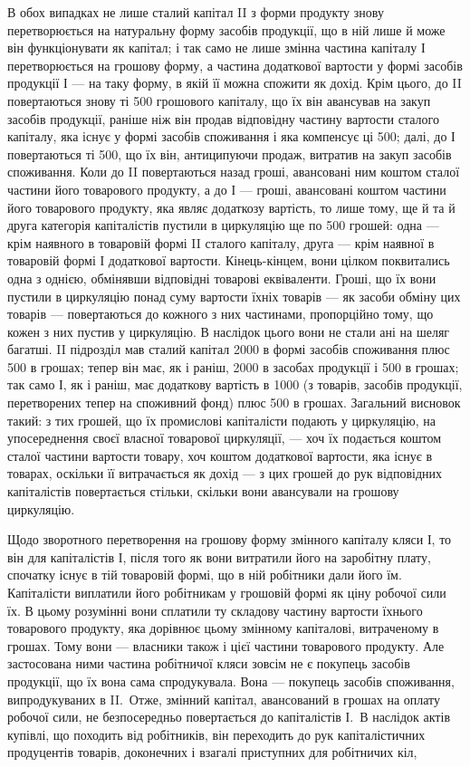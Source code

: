 
В обох випадках не лише сталий капітал II з форми продукту знову
перетворюється на натуральну форму засобів продукції, що в ній лише
й може він функціонувати як капітал; і так само не лише змінна частина
капіталу І перетворюється на грошову форму, а частина додаткової вартости
у формі засобів продукції І — на таку форму, в якій її можна спожити
як дохід. Крім цього, до II повертаються знову ті 500 грошового
капіталу, що їх він авансував на закуп засобів продукції, раніше ніж він
продав відповідну частину вартости сталого капіталу, яка існує у формі
засобів споживання і яка компенсує ці 500; далі, до І повертаються
ті 500, що їх він, антиципуючи продаж, витратив на
закуп засобів споживання. Коли до II повертаються назад гроші, авансовані
ним коштом сталої частини його товарового продукту, а до І — гроші,
авансовані коштом частини його товарового продукту, яка являє додаткозу
вартість, то лише тому, ще й та й друга категорія капіталістів пустили
в циркуляцію ще по 500 грошей: одна — крім наявного
в товаровій формі II сталого капіталу, друга — крім наявної в товаровій
формі І додаткової вартости. Кінець-кінцем, вони цілком поквитались одна
з однією, обмінявши відповідні товарові еквіваленти. Гроші, що їх вони
пустили в циркуляцію понад суму вартости їхніх товарів — як засоби обміну
цих товарів — повертаються до кожного з них частинами, пропорційно
тому, що кожен з них пустив у циркуляцію. В наслідок цього вони не
стали ані на шеляг багатші. II підрозділ мав сталий капітал \deq{} 2000 в формі
засобів споживання плюс 500 в грошах; тепер він має, як і раніш, 2000
в засобах продукції і 500 в грошах; так само І, як і раніш, має додаткову
вартість в 1000 (з товарів, засобів продукції, перетворених тепер
на споживний фонд) плюс 500 в грошах. Загальний висновок такий:
з тих грошей, що їх промислові капіталісти подають у циркуляцію, на
упосереднення своєї власної товарової циркуляції, — хоч їх подається
коштом сталої частини вартости товару, хоч коштом додаткової вартости,
яка існує в товарах, оскільки її витрачається як дохід — з цих грошей до
рук відповідних капіталістів повертається стільки, скільки вони авансували
на грошову циркуляцію.

Щодо зворотного перетворення на грошову форму змінного капіталу
кляси І, то він для капіталістів І, після того як вони витратили його на
заробітну плату, спочатку існує в тій товаровій формі, що в ній робітники
дали його їм. Капіталісти виплатили його робітникам у грошовій
формі як ціну робочої сили їх. В цьому розумінні вони сплатили ту
складову частину вартости їхнього товарового продукту, яка дорівнює
цьому змінному капіталові, витраченому в грошах. Тому вони — власники також
і цієї частини товарового продукту. Але застосована ними частина робітничої
кляси зовсім не є покупець засобів продукції, що їх вона сама
спродукувала. Вона — покупець засобів споживання, випродукуваних в II.~Отже, змінний капітал, авансований в грошах на оплату робочої сили, не
безпосередньо повертається до капіталістів І.~В наслідок актів купівлі,
що походить від робітників, він переходить до рук капіталістичних продуцентів
товарів, доконечних і взагалі приступних для робітничих кіл,
\parbreak{}  %
